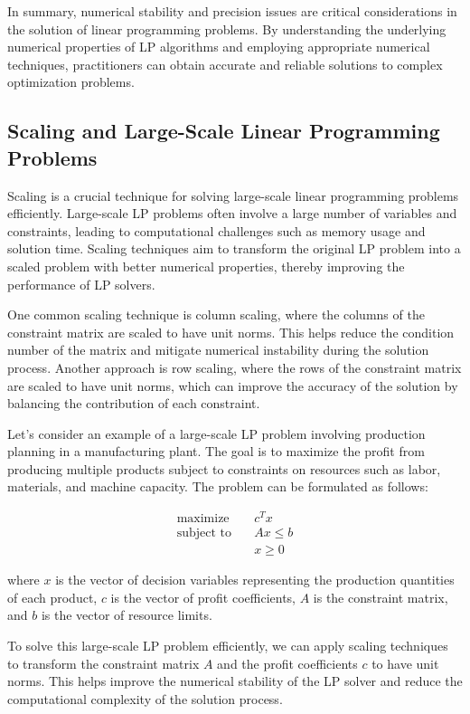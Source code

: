 \documentclass[12pt]{book} %
\begin{document}
In summary, numerical stability and precision issues are critical considerations in the solution of linear programming problems. By understanding the underlying numerical properties of LP algorithms and employing appropriate numerical techniques, practitioners can obtain accurate and reliable solutions to complex optimization problems.


\subsection{Scaling and Large-Scale Linear Programming Problems}

Scaling is a crucial technique for solving large-scale linear programming problems efficiently. Large-scale LP problems often involve a large number of variables and constraints, leading to computational challenges such as memory usage and solution time. Scaling techniques aim to transform the original LP problem into a scaled problem with better numerical properties, thereby improving the performance of LP solvers.

One common scaling technique is column scaling, where the columns of the constraint matrix are scaled to have unit norms. This helps reduce the condition number of the matrix and mitigate numerical instability during the solution process. Another approach is row scaling, where the rows of the constraint matrix are scaled to have unit norms, which can improve the accuracy of the solution by balancing the contribution of each constraint.

Let's consider an example of a large-scale LP problem involving production planning in a manufacturing plant. The goal is to maximize the profit from producing multiple products subject to constraints on resources such as labor, materials, and machine capacity. The problem can be formulated as follows:

\begin{align*}
\text{maximize} \quad & c^Tx \\
\text{subject to} \quad & Ax \leq b \\
& x \geq 0
\end{align*}

where \(x\) is the vector of decision variables representing the production quantities of each product, \(c\) is the vector of profit coefficients, \(A\) is the constraint matrix, and \(b\) is the vector of resource limits.

To solve this large-scale LP problem efficiently, we can apply scaling techniques to transform the constraint matrix \(A\) and the profit coefficients \(c\) to have unit norms. This helps improve the numerical stability of the LP solver and reduce the computational complexity of the solution process.
\end{document}
